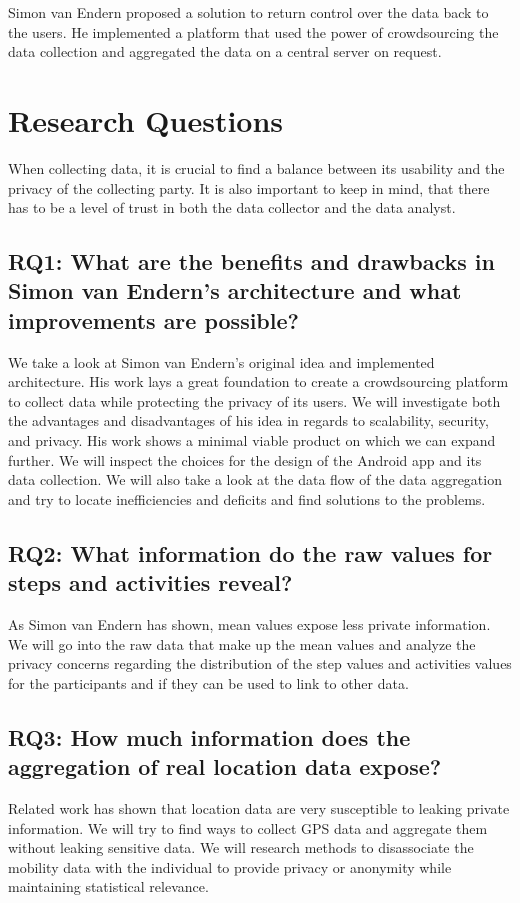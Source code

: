 Simon van Endern proposed a solution to return control over the data back to the users. He implemented a platform that used the power of crowdsourcing the data collection and aggregated the data on a central server on request. \cite{simon}

\section{Research Questions}
When collecting data, it is crucial to find a balance between its usability and the privacy of the collecting party. It is also important to keep in mind, that there has to be a level of trust in both the data collector and the data analyst.
\subsection*{RQ1: What are the benefits and drawbacks in Simon van Endern's architecture and what improvements are possible?}
We take a look at Simon van Endern's original idea and implemented architecture. His work lays a great foundation to create a crowdsourcing platform to collect data while protecting the privacy of its users. We will investigate both the advantages and disadvantages of his idea in regards to scalability, security, and privacy. His work shows a minimal viable product on which we can expand further. We will inspect the choices for the design of the Android app and its data collection. We will also take a look at the data flow of the data aggregation and try to locate inefficiencies and deficits and find solutions to the problems.
\subsection*{RQ2: What information do the raw values for steps and activities reveal?}
As Simon van Endern has shown, mean values expose less private information. We will go into the raw data that make up the mean values and analyze the privacy concerns regarding the distribution of the step values and activities values for the participants and if they can be used to link to other data.
\subsection*{RQ3: How much information does the aggregation of real location data expose?}
Related work has shown that location data are very susceptible to leaking private information. We will try to find ways to collect GPS data and aggregate them without leaking sensitive data. We will research methods to disassociate the mobility data with the individual to provide privacy or anonymity while maintaining statistical relevance.
